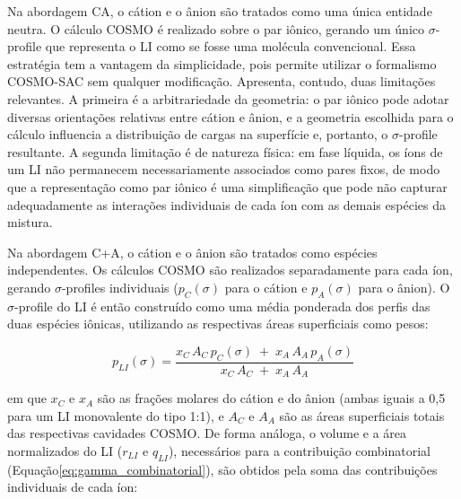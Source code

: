 
Na abordagem CA, o cátion e o ânion são tratados como uma única entidade neutra. O cálculo COSMO é realizado sobre o par iônico, gerando um único $\sigma$-profile que representa o LI como se fosse uma molécula convencional\cite{dominguez2014}. Essa estratégia tem a vantagem da simplicidade, pois permite utilizar o formalismo COSMO-SAC sem qualquer modificação. Apresenta, contudo, duas limitações relevantes. A primeira é a arbitrariedade da geometria: o par iônico pode adotar diversas orientações relativas entre cátion e ânion, e a geometria escolhida para o cálculo influencia a distribuição de cargas na superfície e, portanto, o $\sigma$-profile resultante. A segunda limitação é de natureza física: em fase líquida, os íons de um LI não permanecem necessariamente associados como pares fixos, de modo que a representação como par iônico é uma simplificação que pode não capturar adequadamente as interações individuais de cada íon com as demais espécies da mistura\cite{dominguez2014}.


Na abordagem C+A, o cátion e o ânion são tratados como espécies independentes. Os cálculos COSMO são realizados separadamente para cada íon, gerando $\sigma$-profiles individuais ($p_C(\sigma)$ para o cátion e $p_A(\sigma)$ para o ânion). O $\sigma$-profile do LI é então construído como uma média ponderada dos perfis das duas espécies iônicas, utilizando
as respectivas áreas superficiais como pesos\cite{dominguez2014}:

\begin{equation}
    p_{LI}(\sigma) =
    \frac{x_C \, A_C \, p_C(\sigma) \;+\; x_A \, A_A \, p_A(\sigma)}
         {x_C \, A_C \;+\; x_A \, A_A}
    \label{eq:sigma_profile_ca}
\end{equation}

\noindent em que $x_C$ e $x_A$ são as frações molares do cátion e do ânion (ambas iguais a 0,5 para um LI monovalente do tipo 1:1), e $A_C$ e $A_A$ são as áreas superficiais totais das respectivas cavidades COSMO. De forma análoga, o volume e a área normalizados do LI ($r_{LI}$ e $q_{LI}$), necessários para a contribuição combinatorial (Equação\ref{eq:gamma_combinatorial}), são obtidos pela soma das contribuições individuais de cada íon\cite{dominguez2014}:

